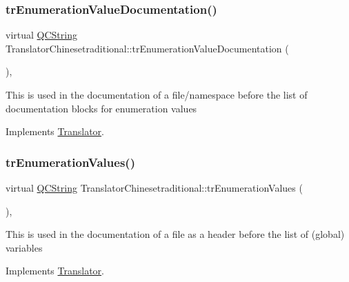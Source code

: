 \subsubsection{\texorpdfstring{trEnumerationValueDocumentation()}{trEnumerationValueDocumentation()}}
{\footnotesize\ttfamily virtual \mbox{\hyperlink{class_q_c_string}{Q\+C\+String}} Translator\+Chinesetraditional\+::tr\+Enumeration\+Value\+Documentation (\begin{DoxyParamCaption}{ }\end{DoxyParamCaption})\hspace{0.3cm}{\ttfamily [inline]}, {\ttfamily [virtual]}}

This is used in the documentation of a file/namespace before the list of documentation blocks for enumeration values 

Implements \mbox{\hyperlink{class_translator}{Translator}}.

\mbox{\label{class_translator_chinesetraditional_aa7461e7db8825b28727eb0df9dfc1095}} 
\subsubsection{\texorpdfstring{trEnumerationValues()}{trEnumerationValues()}}
{\footnotesize\ttfamily virtual \mbox{\hyperlink{class_q_c_string}{Q\+C\+String}} Translator\+Chinesetraditional\+::tr\+Enumeration\+Values (\begin{DoxyParamCaption}{ }\end{DoxyParamCaption})\hspace{0.3cm}{\ttfamily [inline]}, {\ttfamily [virtual]}}

This is used in the documentation of a file as a header before the list of (global) variables 

Implements \mbox{\hyperlink{class_translator}{Translator}}.

\mbox{\label{class_translator_chinesetraditional_ad618207c34ac0cdd9b6ef4e06760be70}} 

